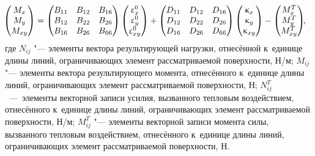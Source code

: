 \begin{equation}\label{eq:M_matrix}%
\hspace{-1em}%
    \begin{pmatrix}
    M_{x}\\
    M_{y}\\
    M_{xy}
    \end{pmatrix}
    =
    \begin{pmatrix}
    B_{11} & B_{12} & B_{16}\\
    B_{12} & B_{22} & B_{26}\\
    B_{16} & B_{26} & B_{66}
    \end{pmatrix}
    \begin{pmatrix}
    \epsilon_{x}^0\\
    \epsilon_{y}^0\\
    \epsilon_{xy}^0
    \end{pmatrix}
    +
    \begin{pmatrix}
    D_{11} & D_{12} & D_{16}\\
    D_{12} & D_{22} & D_{26}\\
    D_{16} & D_{26} & D_{66}
    \end{pmatrix}
    \begin{pmatrix}
    \kappa_{x}\\
    \kappa_{y}\\
    \kappa_{xy}
    \end{pmatrix}
    -
    \begin{pmatrix}
    M_{x}^T\\
    M_{y}^T\\
    M_{xy}^T
    \end{pmatrix}\!\!,
\end{equation}
где $ N_{ij} $ "--- элементы вектора результирующей нагрузки, отнесённой к~единице длины линий, ограничивающих элемент рассматриваемой поверхности, Н/м;
$ M_{ij} $ "--- элементы вектора результирующего момента, отнесённого к~единице длины линий, ограничивающих элемент рассматриваемой поверхности, Н;
$ N_{ij}^T $~---~элементы векторной записи усилия, вызванного тепловым воздействием, отнесённого к~единице длины линий, ограничивающих элемент рассматриваемой поверхности, \mbox{Н/м};
$ M_{ij}^T $ "--- элементы векторной записи момента силы, вызванного тепловым воздействием, отнесённого к~единице длины линий, ограничивающих элемент рассматриваемой поверхности, Н.


